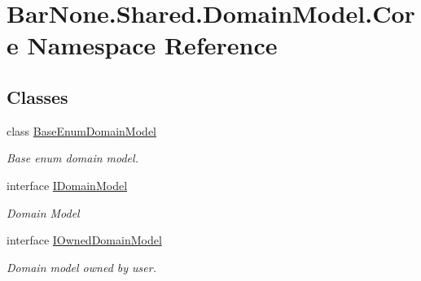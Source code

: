 \hypertarget{namespace_bar_none_1_1_shared_1_1_domain_model_1_1_core}{}\section{Bar\+None.\+Shared.\+Domain\+Model.\+Core Namespace Reference}
\label{namespace_bar_none_1_1_shared_1_1_domain_model_1_1_core}
\subsection*{Classes}
\begin{DoxyCompactItemize}
\item 
class \mbox{\hyperlink{class_bar_none_1_1_shared_1_1_domain_model_1_1_core_1_1_base_enum_domain_model}{Base\+Enum\+Domain\+Model}}
\begin{DoxyCompactList}\small\item\em Base enum domain model. \end{DoxyCompactList}\item 
interface \mbox{\hyperlink{interface_bar_none_1_1_shared_1_1_domain_model_1_1_core_1_1_i_domain_model}{I\+Domain\+Model}}
\begin{DoxyCompactList}\small\item\em Domain Model \end{DoxyCompactList}\item 
interface \mbox{\hyperlink{interface_bar_none_1_1_shared_1_1_domain_model_1_1_core_1_1_i_owned_domain_model}{I\+Owned\+Domain\+Model}}
\begin{DoxyCompactList}\small\item\em Domain model owned by user. \end{DoxyCompactList}\end{DoxyCompactItemize}
